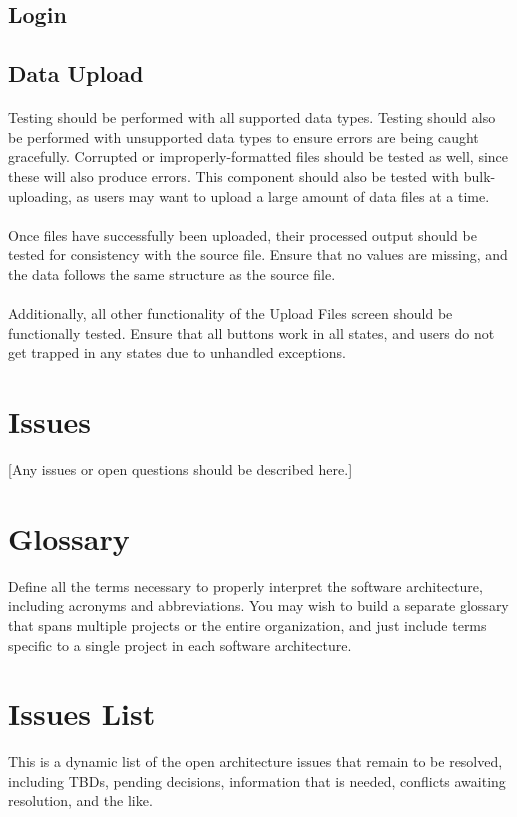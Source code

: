 \documentclass[12pt,oneside,letterpaper]{article}
\begin{document}
\subsection{Login}

\subsection{Data Upload}
\paragraph{} Testing should be performed with all supported data types. Testing should also be performed with unsupported data types to ensure errors are being caught gracefully. Corrupted or improperly-formatted files should be tested as well, since these will also produce errors. This component should also be tested with bulk-uploading, as users may want to upload a large amount of data files at a time.
\paragraph{} Once files have successfully been uploaded, their processed output should be tested for consistency with the source file. Ensure that no values are missing, and the data follows the same structure as the source file.
\paragraph{} Additionally, all other functionality of the Upload Files screen should be functionally tested. Ensure that all buttons work in all states, and users do not get trapped in any states due to unhandled exceptions.

\section{Issues}
[Any issues or open questions should be described here.]

\appendix
\section{Glossary}
Define all the terms necessary to properly interpret the software architecture, including acronyms and abbreviations. You may wish to build a separate glossary that spans multiple projects or the entire organization, and just include terms specific to a single project in each software architecture.

\section{Issues List}
This is a dynamic list of the open architecture issues that remain to be resolved, including TBDs, pending decisions, information that is needed, conflicts awaiting resolution, and the like.
\end{document}
